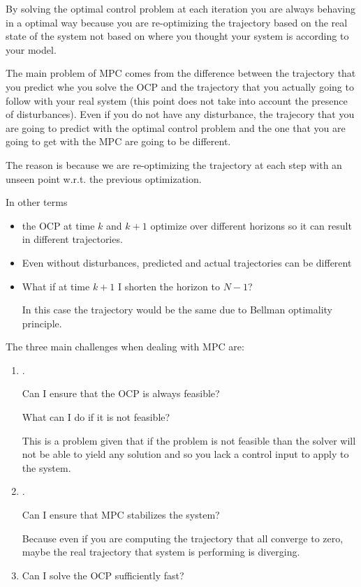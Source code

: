 By solving the optimal control problem at each iteration you are always behaving in a optimal way because you are re-optimizing the trajectory based on the real state of the system not based on where you thought your system is according to your model.

The main problem of MPC comes from the difference between the trajectory that you predict whe you solve the OCP and the trajectory that you actually going to follow with your real system (this point does not take into account the presence of disturbances). Even if you do not have any disturbance, the trajecory that you are going to predict with the optimal control problem and the one that you are going to get with the MPC are going to be different.

The reason is because we are re-optimizing the trajectory at each step with an unseen point w.r.t. the previous optimization.


In other terms
\begin{itemize}
\item the OCP at time $k$ and $k+1$ optimize over different horizons so it can result in different trajectories.
\item Even without disturbances, predicted and actual trajectories can be different
\item What if at time $k+1$ I shorten the horizon to $N-1$? 

In this case the trajectory would be the same due to Bellman optimality principle.
\end{itemize}

The three main challenges when dealing with MPC are: 
\begin{enumerate}
\item {}.

Can I ensure that the OCP is always feasible?

What can I do if it is not feasible?

This is a problem given that if the problem is not feasible than the solver will not be able to yield any solution and so you lack a control input to apply to the system.
\item {}.

Can I ensure that MPC stabilizes the system?

Because even if you are computing the trajectory that all converge to zero, maybe the real trajectory that system is performing is diverging.
\item {}

Can I solve the OCP sufficiently fast?
\end{enumerate}

